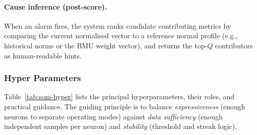 \documentclass[sigconf]{acmart}
\begin{document}
\paragraph{Cause inference (post-score).}
When an alarm fires, the system ranks candidate contributing metrics by comparing the current normalised vector to a reference normal profile (e.g., historical norms or the BMU weight vector), and returns the top-$Q$ contributors as human-readable hints.

%
\subsubsection{Hyper Parameters}
\label{subsubsec:som-hyper}

Table~\ref{tab:som-hyper} lists the principal hyperparameters, their roles, and practical guidance. The guiding principle is to balance \emph{expressiveness} (enough neurons to separate operating modes) against \emph{data sufficiency} (enough independent samples per neuron) and \emph{stability} (threshold and streak logic).
\end{document}
